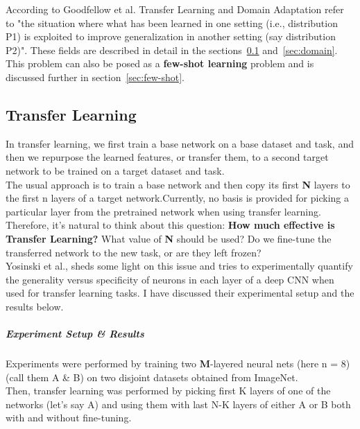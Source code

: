 According to {Goodfellow et al.}\cite{Goodfellow-et-al-2016} Transfer Learning and Domain Adaptation refer to "the situation where what has been learned in one setting (i.e., distribution P1) is exploited to improve generalization in another setting (say distribution P2)". These fields are described in detail in the sections~\ref{sec:transfer} and~\ref{sec:domain}.\\

This problem can also be posed as a \textbf{few-shot learning} problem and is discussed  further in section~\ref{sec:few-shot}.

\subsection{Transfer Learning}
\label{sec:transfer}
In transfer learning, we first train a base network on a base dataset and task, and then we repurpose the learned features, or transfer them, to a second target network to be trained on a target dataset and task. \\

The usual approach is to train a base network and then copy its first \textbf{N} layers to the first n layers of a target network.Currently, no basis is provided for picking a particular layer from the pretrained network when using transfer learning.\\ 

Therefore, it's natural to think about this question: \textbf{How much effective is Transfer Learning?} What value of \textbf{N} should be used? Do we fine-tune the transferred network to the new task, or are they left frozen? \\

    {Yosinski et al.}\cite{DBLP:journals/corr/YosinskiCBL14}, sheds some light on this issue and tries to experimentally quantify the generality versus specificity of neurons in each layer of a deep CNN when used for transfer learning tasks. I have discussed their experimental setup and the results below.
    \subparagraph{Experiment Setup \& Results} Experiments were performed by training two \textbf{M}-layered neural nets (here n = 8) (call them A \& B) on two disjoint datasets obtained from ImageNet.\\
    
    Then, transfer learning was performed by picking first K layers of one of the networks (let's say A) and using them with last N-K layers of either A or B both with and without fine-tuning. \\

